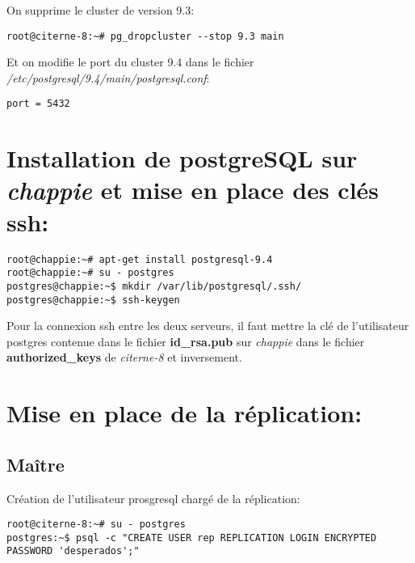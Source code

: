 \vspace{2mm}

On supprime le cluster de version 9.3:
\smallskip
\begin{Verbatim}[frame=single,framerule=1mm,framesep=3mm,rulecolor=\color{brown}]
root@citerne-8:~# pg_dropcluster --stop 9.3 main 
\end{Verbatim}

\vspace{2mm}

Et on modifie le port du cluster 9.4 dans le fichier \textit{/etc/postgresql/9.4/main/postgresql.conf}:
\smallskip
\begin{Verbatim}[frame=single,framerule=1mm,framesep=3mm,rulecolor=\color{brown}]
port = 5432
\end{Verbatim}

\section{Installation de postgreSQL sur \textit{chappie} et mise en place des clés ssh:}

\bigskip
\begin{Verbatim}[frame=single,framerule=1mm,framesep=3mm,rulecolor=\color{brown}]
root@chappie:~# apt-get install postgresql-9.4
root@chappie:~# su - postgres
postgres@chappie:~$ mkdir /var/lib/postgresql/.ssh/
postgres@chappie:~$ ssh-keygen
\end{Verbatim}

Pour la connexion ssh entre les deux serveurs, il faut mettre la clé de l'utilisateur postgres contenue dans le fichier \textbf{id\_rsa.pub} sur \textit{chappie} dans le fichier \textbf{authorized\_keys} de \textit{citerne-8} et inversement.

\section{Mise en place de la réplication:}

\subsection{\textcolor{Firebrick3}{\Large Maître}}

Création de l'utilisateur prosgresql chargé de la réplication:
\smallskip
\begin{Verbatim}[frame=single,framerule=1mm,framesep=3mm,rulecolor=\color{brown}]
root@citerne-8:~# su - postgres
postgres:~$ psql -c "CREATE USER rep REPLICATION LOGIN ENCRYPTED PASSWORD 'desperados';"
\end{Verbatim}

